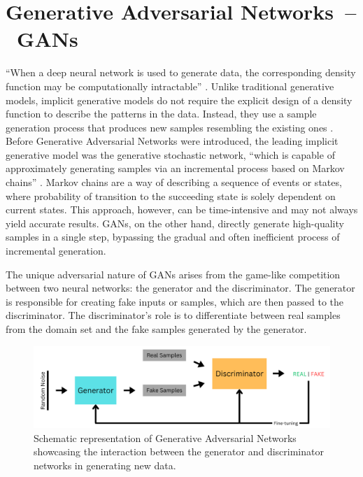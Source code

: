 \section{Generative Adversarial Networks~--~GANs}\label{GAN}

``When a deep neural network is used to generate data, the corresponding density function may be computationally intractable'' \citep{goodfellowGAN}. Unlike traditional generative models, implicit generative models do not require the explicit design of a density function to describe the patterns in the data. Instead, they use a sample generation process that produces new samples resembling the existing ones \citep{goodfellowGAN}. Before Generative Adversarial Networks were introduced, the leading implicit generative model was the generative stochastic network, ``which is capable of approximately generating samples via an incremental process based on Markov chains'' \citep{goodfellowGAN}. Markov chains are a way of describing a sequence of events or states, where probability of transition to the succeeding state is solely dependent on current states. This approach, however, can be time-intensive and may not always yield accurate results. GANs, on the other hand, directly generate high-quality samples in a single step, bypassing the gradual and often inefficient process of incremental generation.

The unique adversarial nature of GANs arises from the game-like competition between two neural networks: the generator and the discriminator. The generator is responsible for creating fake inputs or samples, which are then passed to the discriminator. The discriminator's role is to differentiate between real samples from the domain set and the fake samples generated by the generator.

\begin{figure}[ht]
\centering
  \includegraphics[width=1\columnwidth]{figures/Generator.png}
  \caption{Schematic representation of Generative Adversarial Networks showcasing the interaction between the generator and discriminator networks in generating new data.}\label{fig:figureGAN}
\end{figure}

